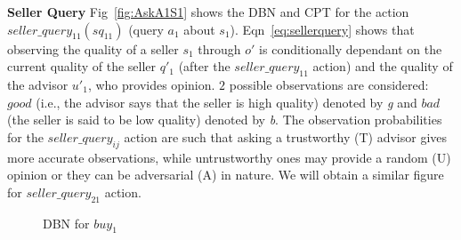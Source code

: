 \documentclass{aamas2013}
\begin{document}
 \textbf{Seller Query} Fig~\ref{fig:AskA1S1} shows the DBN and CPT for the action $seller\_query_{11} (sq_{11})$ (query $a_1$ about $s_1$).  Eqn~\ref{eq:sellerquery} shows that observing the quality of a seller $s_1$ through $o'$ is conditionally dependant on the current quality of the seller $q'_1$ (after the $seller\_query_{11}$ action) and the quality of the advisor $u'_1$, who provides opinion. $2$ possible observations are considered: $good$ (i.e., the advisor says that the seller is high quality) denoted by \textit{g} and $bad$ (the seller is said to be low quality) denoted by \textit{b}.  The observation probabilities for the $seller\_query_{ij}$ action are such that asking a trustworthy (T) advisor gives more accurate observations, while untrustworthy ones may provide a random (U) opinion or they can be adversarial (A) in nature.  We will obtain a similar figure for $seller\_query_{21}$ action.\\
 \vspace{-5mm}
 \begin{figure}[h!]
\caption{DBN for $buy_{1}$} \label{fig:BuyS1}
\end{figure}
\end{document}
